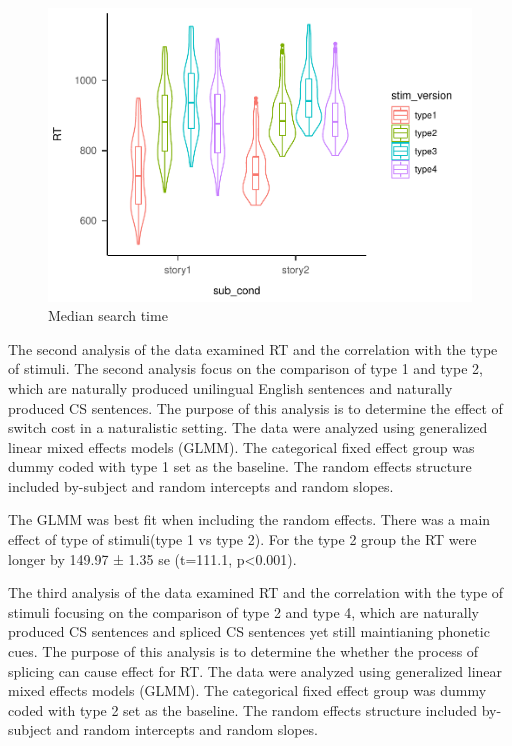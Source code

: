 \documentclass[
  english,
  man,floatsintext]{apa6}
\begin{document}
\begin{figure}
\centering
\includegraphics{FP_Jiawei_files/figure-latex/plot1-1.pdf}
\caption{\label{fig:plot1}Median search time}
\end{figure}

The second analysis of the data examined RT and the correlation with the type of stimuli. The second analysis focus on the comparison of type 1 and type 2, which are naturally produced unilingual English sentences and naturally produced CS sentences. The purpose of this analysis is to determine the effect of switch cost in a naturalistic setting. The data were analyzed using generalized linear mixed effects models (GLMM). The categorical fixed effect group was dummy coded with type 1 set as the baseline. The random effects structure included by-subject and random intercepts and random slopes.

The GLMM was best fit when including the random effects. There was a main effect of type of stimuli(type 1 vs type 2). For the type 2 group the RT were longer by 149.97 ± 1.35 se (t=111.1, p\textless0.001).

The third analysis of the data examined RT and the correlation with the type of stimuli focusing on the comparison of type 2 and type 4, which are naturally produced CS sentences and spliced CS sentences yet still maintianing phonetic cues. The purpose of this analysis is to determine the whether the process of splicing can cause effect for RT. The data were analyzed using generalized linear mixed effects models (GLMM). The categorical fixed effect group was dummy coded with type 2 set as the baseline. The random effects structure included by-subject and random intercepts and random slopes.
\end{document}
